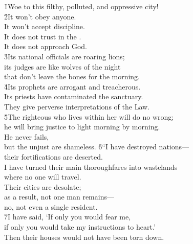 \begin{poetry}
\poeml {}
\v{1}Woe to this filthy, polluted, and oppressive city! \\
\poeml \v{2}It won't obey anyone. \\
\poeml It won't accept discipline. \\
\poemll    It does not trust in the . \\
\poemlll       It does not approach God. \\
\poeml \v{3}Its national officials are roaring lions; \\
\poemll    its judges are like wolves of the night \\
\poemlll       that don't leave the bones for the morning. \\
\poeml \v{4}Its prophets are arrogant and treacherous. \\
\poemll    Its priests have contaminated the sanctuary. \\
\poemlll       They give perverse interpretations of the Law. \\
\poeml \v{5}The righteous  who lives within her will do no wrong; \\
\poemll    he will bring justice to light morning by morning. \\
\poeml He never fails, \\
\poemll    but the unjust are shameless.
\poeml \v{6}``I have destroyed nations--- \\
\poemll    their fortifications are deserted. \\
\poeml I have turned their main thoroughfares into wastelands \\
\poemll    where no one will travel. \\
\poeml Their cities are desolate; \\
\poemll    as a result, not one man remains--- \\
\poemlll       no, not even a single resident. \\
\poeml \v{7}I have said, `If only you would fear me, \\
\poemll    if only you would take my instructions to heart.' \\
\poemlll       Then their houses would not have been torn down. \\

\end{poetry}
